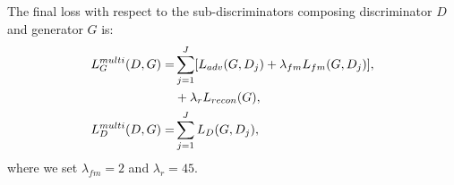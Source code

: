 The final loss with respect to the sub-discriminators composing discriminator $D$ and generator $G$ is:
\begin{equation}
\begin{aligned}
L_G^{multi}(D, G) = &\sum_{j=1}^{J}[L_{adv}(G, D_j) + \lambda_{fm}L_{fm}(G, D_j)], \\ 
                    & + \lambda_{r}L_{recon}(G), \\
L_D^{multi}(D, G) = &  \sum_{j=1}^{J} L_D(G, D_j),
\end{aligned}
\vspace{-0.2cm}
\end{equation}
\vspace{-0.1cm}
where we set $\lambda_{fm}=2$ and $\lambda_{r}=45$.
